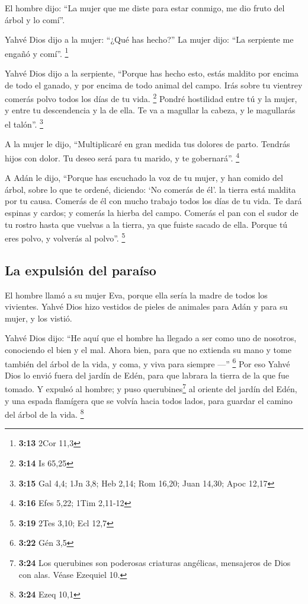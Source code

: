  El hombre dijo: ``La mujer que me diste para estar
conmigo, me dio fruto del árbol y lo comí''.

 Yahvé Dios dijo a la mujer: ``¿Qué has hecho?'' La mujer
dijo: ``La serpiente me engañó y comí''. \footnote{\textbf{3:13} 2Cor
  11,3}

 Yahvé Dios dijo a la serpiente, ``Porque has hecho esto,
estás maldito por encima de todo el ganado, y por encima de todo animal
del campo. Irás sobre tu vientrey comerás polvo todos los días de tu
vida. \footnote{\textbf{3:14} Is 65,25}  Pondré
hostilidad entre tú y la mujer, y entre tu descendencia y la de ella. Te
va a magullar la cabeza, y le magullarás el talón''. \footnote{\textbf{3:15}
  Gal 4,4; 1Jn 3,8; Heb 2,14; Rom 16,20; Juan 14,30; Apoc 12,17}

 A la mujer le dijo, ``Multiplicaré en gran medida tus
dolores de parto. Tendrás hijos con dolor. Tu deseo será para tu marido,
y te gobernará''. \footnote{\textbf{3:16} Efes 5,22; 1Tim 2,11-12}

 A Adán le dijo, ``Porque has escuchado la voz de tu
mujer, y han comido del árbol, sobre lo que te ordené, diciendo: `No
comerás de él'. la tierra está maldita por tu causa. Comerás de él con
mucho trabajo todos los días de tu vida.  Te dará espinas
y cardos; y comerás la hierba del campo.  Comerás el pan
con el sudor de tu rostro hasta que vuelvas a la tierra, ya que fuiste
sacado de ella. Porque tú eres polvo, y volverás al polvo''. \footnote{\textbf{3:19}
  2Tes 3,10; Ecl 12,7}

\hypertarget{la-expulsiuxf3n-del-parauxedso}{%
\subsection{La expulsión del
paraíso}\label{la-expulsiuxf3n-del-parauxedso}}

 El hombre llamó a su mujer Eva, porque ella sería la
madre de todos los vivientes.  Yahvé Dios hizo vestidos
de pieles de animales para Adán y para su mujer, y los vistió.

 Yahvé Dios dijo: ``He aquí que el hombre ha llegado a
ser como uno de nosotros, conociendo el bien y el mal. Ahora bien, para
que no extienda su mano y tome también del árbol de la vida, y coma, y
viva para siempre ---'' \footnote{\textbf{3:22} Gén 3,5} 
Por eso Yahvé Dios lo envió fuera del jardín de Edén, para que labrara
la tierra de la que fue tomado.  Y expulsó al hombre; y
puso querubines\footnote{\textbf{3:24} Los querubines son poderosas
  criaturas angélicas, mensajeros de Dios con alas. Véase Ezequiel 10.}
al oriente del jardín del Edén, y una espada flamígera que se volvía
hacia todos lados, para guardar el camino del árbol de la vida.
\footnote{\textbf{3:24} Ezeq 10,1}

